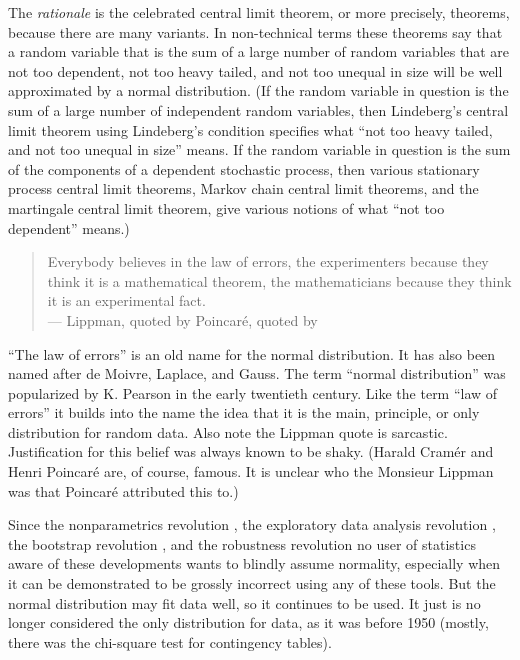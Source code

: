The \emph{rationale} is the celebrated central limit theorem,
or more precisely, theorems, because there are many variants.
In non-technical terms these theorems say that a random variable that is the sum
of a large number of random variables that are not too dependent,
not too heavy tailed, and not too unequal in size will be well approximated
by a normal distribution.  (If the random variable in question is the
sum of a large number of independent random variables, then Lindeberg's
central limit theorem using Lindeberg's condition specifies what
``not too heavy tailed, and not too unequal in size'' means.
If the random variable in question is the
sum of the components of a dependent stochastic process, then various
stationary process central limit theorems, Markov chain central limit theorems,
and the martingale central limit theorem, give various notions of what
``not too dependent'' means.)
\begin{quotation}
Everybody believes in the law of errors, the experimenters because they
think it is a mathematical theorem, the mathematicians because they
think it is an experimental fact.
\\
\hspace*{\fill} --- Lippman, quoted by Poincar\'{e}, quoted by \citet{cramer}
\end{quotation}
``The law of errors'' is an old name for the normal distribution.
It has also been named after de Moivre, Laplace, and Gauss.
The term ``normal distribution'' was popularized by K. Pearson in the early
twentieth century.  Like the term ``law of errors'' it builds into the name
the idea that it is the main, principle, or only distribution for random data.
Also note the Lippman quote is sarcastic.  Justification
for this belief was always known to be shaky.
(Harald Cram\'{e}r and Henri Poincar\'{e} are, of course, famous.  It is
unclear who the Monsieur Lippman was that Poincar\'{e} attributed this to.)

Since the nonparametrics revolution \citep{hollander-wolfe-chicken},
the exploratory data analysis revolution \citep{tukey},
the bootstrap revolution \citep{efron-tibshirani,davison-hinkley},
and the robustness revolution \citep{huber-ronchetti,hampel-et-al}
no user of statistics aware of these developments wants to blindly
assume normality, especially when it can be demonstrated to be grossly
incorrect using any of these tools.  But the normal distribution may
fit data well, so it continues to be used.  It just is no longer considered
the only distribution for data, as it was before 1950 (mostly, there was
the chi-square test for contingency tables).

